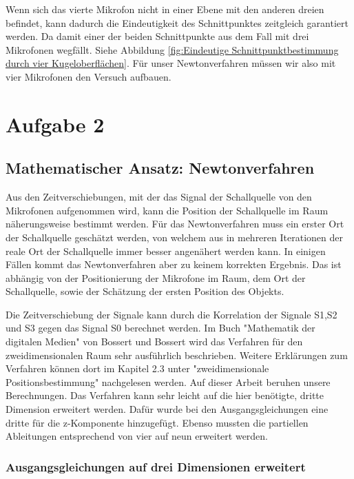 Wenn sich das vierte Mikrofon nicht in einer Ebene mit den anderen dreien befindet, kann dadurch die Eindeutigkeit des Schnittpunktes zeitgleich garantiert werden. Da damit einer der beiden Schnittpunkte aus dem Fall mit drei Mikrofonen wegfällt. Siehe Abbildung \ref{fig:Eindeutige Schnittpunktbestimmung durch vier Kugeloberflächen}. Für unser Newtonverfahren müssen wir also mit vier Mikrofonen den Versuch aufbauen.



\newpage
\pagebreak
\section{Aufgabe 2}
\subsection{Mathematischer Ansatz: Newtonverfahren}
Aus den Zeitverschiebungen, mit der das Signal der Schallquelle von den Mikrofonen aufgenommen wird, kann die Position der Schallquelle im Raum näherungsweise bestimmt werden. Für das Newtonverfahren muss ein erster Ort der Schallquelle geschätzt werden, von welchem aus in mehreren Iterationen der reale Ort der Schallquelle immer besser angenähert werden kann. In einigen Fällen kommt das Newtonverfahren aber zu keinem korrekten Ergebnis. Das ist abhängig von der Positionierung der Mikrofone im Raum, dem Ort der Schallquelle, sowie der Schätzung der ersten Position des Objekts. 

Die Zeitverschiebung der Signale kann durch die Korrelation der Signale S1,S2 und S3 gegen das Signal S0 berechnet werden. Im Buch "Mathematik der digitalen Medien" von Bossert und Bossert wird das Verfahren für den zweidimensionalen Raum sehr ausführlich beschrieben. Weitere Erklärungen zum Verfahren können dort im Kapitel 2.3 unter "zweidimensionale Positionsbestimmung" nachgelesen werden. Auf dieser Arbeit beruhen unsere Berechnungen. Das Verfahren kann sehr leicht auf die hier benötigte, dritte Dimension erweitert werden. Dafür wurde bei den Ausgangsgleichungen eine dritte für die z-Komponente hinzugefügt. Ebenso mussten die partiellen Ableitungen entsprechend von vier auf neun erweitert werden. 
\subsubsection{Ausgangsgleichungen auf drei Dimensionen erweitert}

